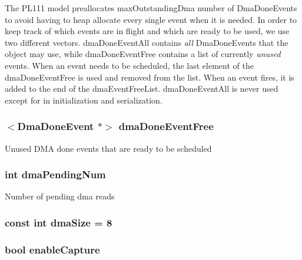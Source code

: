 The PL111 model preallocates maxOutstandingDma number of DmaDoneEvents to avoid having to heap allocate every single event when it is needed. In order to keep track of which events are in flight and which are ready to be used, we use two different vectors. dmaDoneEventAll contains {\itshape all\/} DmaDoneEvents that the object may use, while dmaDoneEventFree contains a list of currently {\itshape unused\/} events. When an event needs to be scheduled, the last element of the dmaDoneEventFree is used and removed from the list. When an event fires, it is added to the end of the dmaEventFreeList. dmaDoneEventAll is never used except for in initialization and serialization. \hypertarget{classPl111_ada9c1832b166debd201f034b2fcb4ab2}{
\subsubsection[{dmaDoneEventFree}]{$<$DmaDoneEvent $\ast$$>$ {\bf dmaDoneEventFree}}}
\label{classPl111_ada9c1832b166debd201f034b2fcb4ab2}
Unused DMA done events that are ready to be scheduled \hypertarget{classPl111_a51a10d47f66c47e4701a3d9a7193eef1}{
\subsubsection[{dmaPendingNum}]{\setlength{\rightskip}{0pt plus 5cm}int {\bf dmaPendingNum}}}
\label{classPl111_a51a10d47f66c47e4701a3d9a7193eef1}
Number of pending dma reads \hypertarget{classPl111_a994e38c05b2540d39ba38c10de8ee688}{
\subsubsection[{dmaSize}]{\setlength{\rightskip}{0pt plus 5cm}const int {\bf dmaSize} = 8}}
\label{classPl111_a994e38c05b2540d39ba38c10de8ee688}
\hypertarget{classPl111_abf8ed1a0152ea70d689ffce800cd32fd}{
\subsubsection[{enableCapture}]{\setlength{\rightskip}{0pt plus 5cm}bool {\bf enableCapture}}}
